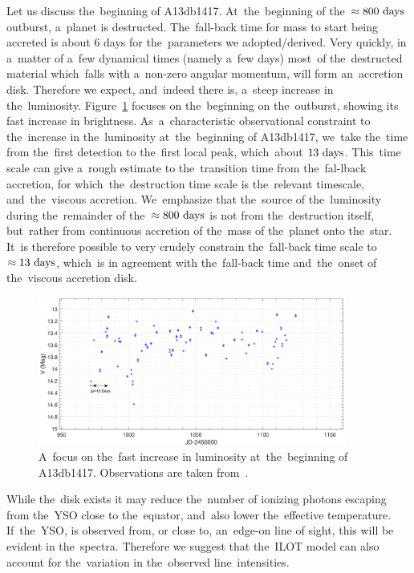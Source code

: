 \documentclass[galaxies,article,accept,moreauthors,pdftex]{mdpi}
\def \days{~\rm{days}}
\begin{document}
Let us discuss the~beginning of A13db1417. At~the~beginning of the~$\approx 800 \days$ outburst, a~planet is destructed. The~fall-back time for mass to start being accreted is about 6 days for the~parameters we adopted/derived.
Very quickly, in a~matter of a~few dynamical times (namely a~few days) most~of the~destructed material which~falls with a~non-zero angular momentum, will form an~accretion disk. Therefore we expect, and~indeed there is, a~steep increase in the~luminosity. Figure~\ref{fig:beginning} focuses on the~beginning on the~outburst, showing its fast increase in brightness. As~a~characteristic observational constraint to the~increase in the~luminosity at~the~beginning of A13db1417, we~take the~time from the~first detection to the~first local peak, which~about $13 \days$. This~time scale can give a~rough estimate to the~transition time from the~fal-lback accretion, for which~the~destruction time scale is the~relevant timescale, and~the~viscous accretion. We~emphasize that the~source of the~luminosity during the~remainder of the~$\approx 800 \days$ is not from the~destruction itself, but~rather from continuous accretion of the~mass of the~planet onto the~star. It~is therefore possible to very crudely constrain the~fall-back time scale to $\approx 13 \days$, which~is in agreement with the~fall-back time and~the~onset of the~viscous accretion disk.

\begin{figure}[t]
\centering
\includegraphics[trim= 0.0cm 0.0cm 0.0cm 0.0cm,clip=true,width=0.9\textwidth]{figure5.pdf} %
\caption{A~focus on the~fast increase in luminosity at~the~beginning of A13db1417.
Observations are taken from~\cite{SiciliaAguilaretal2017}.}
\label{fig:beginning}
\end{figure}


While the~disk exists it may reduce the~number of ionizing photons escaping from the~YSO close to the~equator, and~also lower the~effective temperature. If~the~YSO, is observed from, or close to, an~edge-on line of sight, this will be evident in the~spectra. Therefore we suggest that the~ILOT model can also account for the~variation in the~observed line~intensities.
\end{document}
